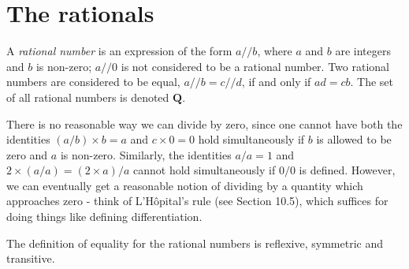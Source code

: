 \section{The rationals}\label{sec 4.2}

\begin{definition}\label{4.2.1}
A \emph{rational number} is an expression of the form \(a // b\), where \(a\) and \(b\) are integers and \(b\) is non-zero;
\(a // 0\) is not considered to be a rational number.
Two rational numbers are considered to be equal, \(a // b = c // d\), if and only if \(ad = cb\).
The set of all rational numbers is denoted \(\mathbf{Q}\).
\end{definition}

\begin{note}
There is no reasonable way we can divide by zero, since one cannot have both the identities \((a / b) \times b = a\) and \(c \times 0 = 0\) hold simultaneously if \(b\) is allowed to be zero and \(a\) is non-zero.
Similarly, the identities \(a / a = 1\) and \(2 \times (a / a) = (2 \times a) / a\) cannot hold simultaneously if \(0 / 0\) is defined.
However, we can eventually get a reasonable notion of dividing by a quantity which approaches zero
- think of L'H\^opital's rule (see Section 10.5), which suffices for doing things like defining differentiation.
\end{note}

\begin{additional corollary}\label{ac 4.2.1}
The definition of equality for the rational numbers is reflexive, symmetric and transitive.
\end{additional corollary}

